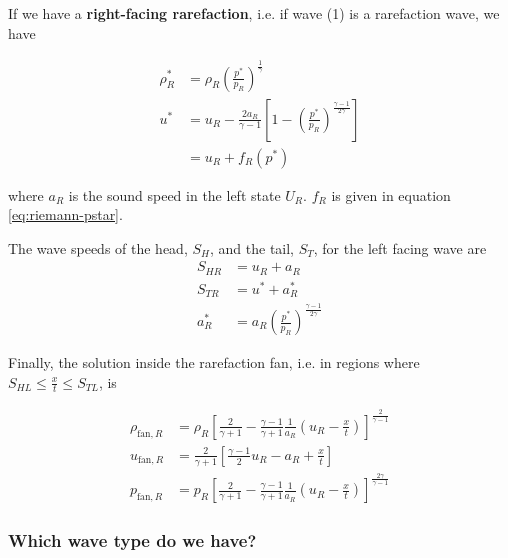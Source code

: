 If we have a \textbf{right-facing rarefaction}, i.e. if wave (1) is a rarefaction wave, we have

\begin{align*}
	\rho^*_R &= 
		\rho_R \left( \frac{p^*}{p_R} \right) ^ \frac{1}{\gamma}\\
	u^* &= 
		u_R - \frac{2 a_R}{\gamma - 1} \left[ 1 - \left( \frac{p^*}{p_R} \right) ^ \frac{\gamma - 1}{2 \gamma}  \right]\\
		&= u_R + f_R(p^*)
\end{align*}

where $a_R$ is the sound speed in the left state $U_R$.
$f_R$ is given in equation \ref{eq:riemann-pstar}.





The wave speeds of the head, $S_H$, and the tail, $S_T$, for the left facing wave are
\begin{align*}
	S_{HR} &= u_R + a_R\\
	S_{TR} &= u^* + a^*_R\\
	a^*_R  &= a_R \left( \frac{p^*}{p_R} \right) ^ \frac{\gamma - 1}{2 \gamma}
\end{align*}




Finally, the solution inside the rarefaction fan, i.e. in regions where $S_{HL} \leq \frac{x}{t} \leq S_{TL}$, is 

\begin{align*}
	\rho_{\text{fan}, R} &= 
		\rho_R \left[ \frac{2}{\gamma + 1} - \frac{\gamma - 1}{\gamma + 1} \frac{1}{a_R} \left(u_R - \frac{x}{t}\right) \right] ^ \frac{2}{\gamma -1 }\\
	u_{\text{fan}, R} &= 
		\frac{2}{\gamma + 1} \left[ \frac{\gamma - 1}{2} u_R - a_R + \frac{x}{t}  \right] \\
	p_{\text{fan}, R} &= 
		p_R \left[ \frac{2}{\gamma + 1} - \frac{\gamma - 1}{\gamma + 1} \frac{1}{a_R} \left(u_R - \frac{x}{t}\right) \right] ^ \frac{2 \gamma}{\gamma -1}
\end{align*}












\subsubsection{Which wave type do we have?}


